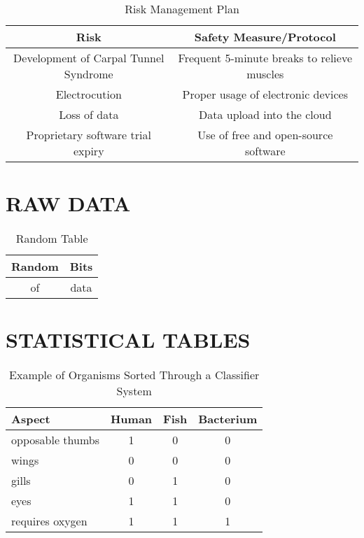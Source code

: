 \documentclass{strrespaper-trad}
\begin{document}
\begin{landscape}
			\begin{table}[htbp]
				\centering
				\caption{Risk Management Plan}
				\label{tab:risk_management}
				\begin{tabularx}{\textwidth}{cc}
					\toprule
					Risk                                  & Safety Measure/Protocol                     \\
					\midrule
					Development of Carpal Tunnel Syndrome & Frequent 5-minute breaks to relieve muscles \\
					Electrocution                         & Proper usage of electronic devices          \\
					Loss of data                          & Data upload into the cloud                  \\
					Proprietary software trial expiry     & Use of free and open-source software        \\
					\bottomrule
				\end{tabularx}
			\end{table}
		\end{landscape}

	\section{RAW DATA}
		\begin{table}[htbp]
			\centering
			\caption{Random Table}
			\label{tab:random}
			\begin{tabular}{cc}
				\toprule
				Random & Bits \\
				\midrule
				of     & data \\
				\bottomrule
			\end{tabular}
		\end{table}
		\lstset{language=Python, breaklines=true, numbers=left, stringstyle=\ttfamily\small, basicstyle=\singlespacing}

		

	\section{STATISTICAL TABLES}
		\begin{table}[htbp]
			\centering
			\caption{Example of Organisms Sorted Through a Classifier System}
			\label{tab:ex_classifier}
			\begin{tabular}{lccc}
				\toprule
				Aspect           & Human & Fish & Bacterium \\
				\midrule
				opposable thumbs & 1     & 0    & 0         \\
				wings            & 0     & 0    & 0         \\
				gills            & 0     & 1    & 0         \\
				eyes             & 1     & 1    & 0         \\
				requires oxygen  & 1     & 1    & 1         \\
				\bottomrule
			\end{tabular}
		\end{table}
\end{document}
